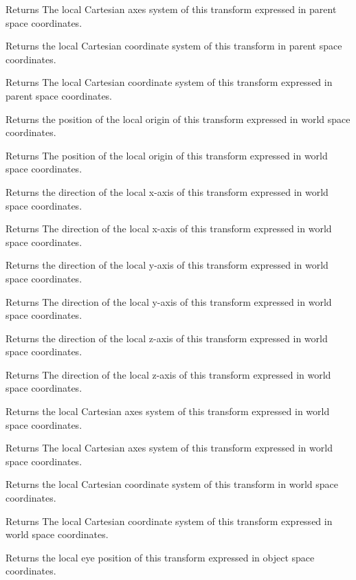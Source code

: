 \begin{DoxyReturn}{Returns}
The local Cartesian axes system of this transform expressed in parent space coordinates.
\end{DoxyReturn}
Returns the local Cartesian coordinate system of this transform in parent space coordinates.

\begin{DoxyReturn}{Returns}
The local Cartesian coordinate system of this transform expressed in parent space coordinates.
\end{DoxyReturn}
Returns the position of the local origin of this transform expressed in world space coordinates.

\begin{DoxyReturn}{Returns}
The position of the local origin of this transform expressed in world space coordinates.
\end{DoxyReturn}
Returns the direction of the local x-\/axis of this transform expressed in world space coordinates.

\begin{DoxyReturn}{Returns}
The direction of the local x-\/axis of this transform expressed in world space coordinates.
\end{DoxyReturn}
Returns the direction of the local y-\/axis of this transform expressed in world space coordinates.

\begin{DoxyReturn}{Returns}
The direction of the local y-\/axis of this transform expressed in world space coordinates.
\end{DoxyReturn}
Returns the direction of the local z-\/axis of this transform expressed in world space coordinates.

\begin{DoxyReturn}{Returns}
The direction of the local z-\/axis of this transform expressed in world space coordinates.
\end{DoxyReturn}
Returns the local Cartesian axes system of this transform expressed in world space coordinates.

\begin{DoxyReturn}{Returns}
The local Cartesian axes system of this transform expressed in world space coordinates.
\end{DoxyReturn}
Returns the local Cartesian coordinate system of this transform in world space coordinates.

\begin{DoxyReturn}{Returns}
The local Cartesian coordinate system of this transform expressed in world space coordinates.
\end{DoxyReturn}
Returns the local eye position of this transform expressed in object space coordinates.

